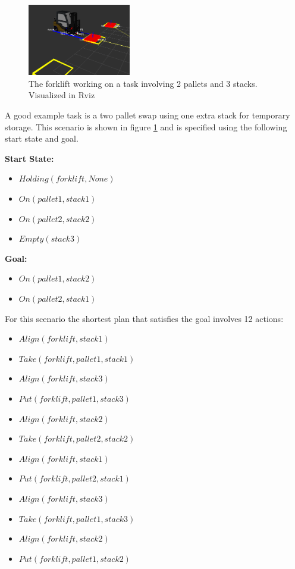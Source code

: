 \documentclass[letterpaper, 10 pt, conference]{ieeeconf}  %
\begin{document}
\begin{figure}[h]
\centering
\includegraphics[width=0.4\textwidth]{forklift1}
\caption{The forklift working on a task involving 2 pallets and 3 stacks. Visualized in Rviz}
\label{fig:forklift1}
\end{figure}

A good example task is a two pallet swap using one extra stack for temporary storage. This scenario is shown in figure \ref{fig:forklift1} and is specified using the following start state and goal.

\noindent\textbf{Start State:}
\begin{itemize}
	\item $Holding(forklift, None)$
	\item $On(pallet1, stack1)$
	\item $On(pallet2, stack2)$
	\item $Empty(stack3)$
\end{itemize}

\noindent\textbf{Goal:}
\begin{itemize}
	\item $On(pallet1, stack2)$
	\item $On(pallet2, stack1)$
\end{itemize}

For this scenario the shortest plan that satisfies the goal involves 12 actions:

\begin{itemize}
	\item $Align(forklift, stack1)$
	\item $Take(forklift, pallet1, stack1)$
	\item $Align(forklift, stack3)$
	\item $Put(forklift, pallet1, stack3)$
	\item $Align(forklift, stack2)$
	\item $Take(forklift, pallet2, stack2)$
	\item $Align(forklift, stack1)$
	\item $Put(forklift, pallet2, stack1)$
	\item $Align(forklift, stack3)$
	\item $Take(forklift, pallet1, stack3)$
	\item $Align(forklift, stack2)$
	\item $Put(forklift, pallet1, stack2)$
\end{itemize}
\end{document}
